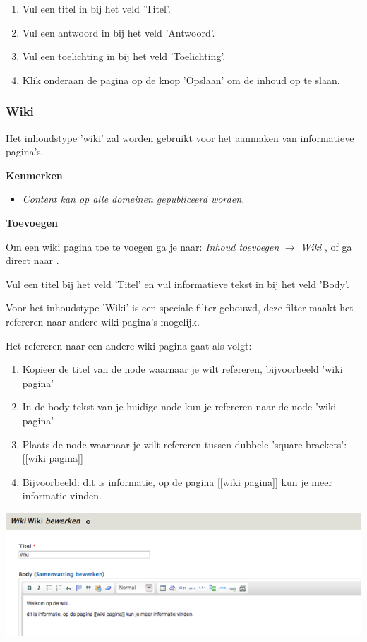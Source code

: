 \begin{enumerate}
\item Vul een titel in bij het veld 'Titel'.
\item Vul een antwoord in bij het veld 'Antwoord'.
\item Vul een toelichting in bij het veld 'Toelichting'.
\item Klik onderaan de pagina op de knop 'Opslaan' om de inhoud op te slaan.
\end{enumerate}

\subsubsection{Wiki}\label{wiki}
Het inhoudstype 'wiki' zal worden gebruikt voor het aanmaken van informatieve pagina's.

\textbf{Kenmerken}

\begin{itemize}
\item \emph{Content kan op alle domeinen gepubliceerd worden.}
\end{itemize}

\textbf{Toevoegen}

Om een wiki pagina toe te voegen ga je naar: \emph{Inhoud toevoegen} $\rightarrow$ \emph{Wiki} , of ga direct naar .

Vul een titel bij het veld 'Titel' en vul informatieve tekst in bij het veld 'Body'.

Voor het inhoudstype 'Wiki' is een speciale filter gebouwd, deze filter maakt het refereren naar andere wiki pagina's mogelijk. 

Het refereren naar een andere wiki pagina gaat als volgt: 

\begin{enumerate}
\item Kopieer de titel van de node waarnaar je wilt refereren, bijvoorbeeld 'wiki pagina'
\item In de body tekst van je huidige node kun je refereren naar de node 'wiki pagina'
\item Plaats de node waarnaar je wilt refereren tussen dubbele 'square brackets': [[wiki pagina]]
\item Bijvoorbeeld: dit is informatie, op de pagina [[wiki pagina]] kun je meer informatie vinden.
\end{enumerate}

\bigskip

\begin{center}
	\includegraphics[width=\textwidth]{img/wiki.png}
\end{center}